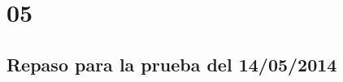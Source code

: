 \section{05}

\subsection{Repaso para la prueba del 14/05/2014}
\begin{enumerate}

\end{enumerate}

